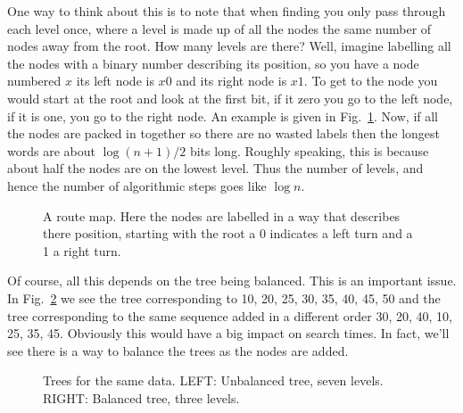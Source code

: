 \documentclass[11pt,a4paper]{scrartcl}
\begin{document}
One way to think about this is to note that when finding you only pass
through each level once, where a level is made up of all the nodes the
same number of nodes away from the root. How many levels are there?
Well, imagine labelling all the nodes with a binary number describing
its position, so you have a node numbered $x$ its left node is $x0$
and its right node is $x1$. To get to the node you would start at the
root and look at the first bit, if it zero you go to the left node, if
it is one, you go to the right node. An example is given in
Fig.~\ref{fig_tree_route}. Now, if all the nodes are packed in
together so there are no wasted labels then the longest words are
about $\log{(n+1)/2}$ bits long. Roughly speaking, this is because
about half the nodes are on the lowest level. Thus the number of
levels, and hence the number of algorithmic steps goes like $\log{n}$.

\begin{figure}
\begin{center}
\end{center}
\caption{A route map. Here the nodes are labelled in a way that describes there position, starting with the root a 0 indicates a left turn and a 1 a right turn.\label{fig_tree_route}}
\end{figure}

Of course, all this depends on the tree being balanced. This is an
important issue. In Fig.~\ref{fig_balance} we see the tree
corresponding to 10, 20, 25, 30, 35, 40, 45, 50 and the tree
corresponding to the same sequence added in a different order 30, 20,
40, 10, 25, 35, 45. Obviously this would have a big impact on search
times. In fact, we'll see there is a way to balance the trees as the
nodes are added.

\begin{figure}
\begin{center}
\qquad
{}
\end{center}
\caption{Trees for the same data. LEFT: Unbalanced tree, seven levels. RIGHT: Balanced tree, three levels.\label{fig_balance}}
\end{figure}
\end{document}
